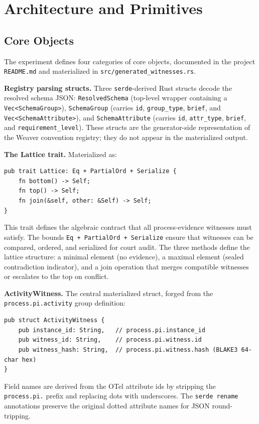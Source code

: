
\section{Architecture and Primitives}
\label{sec:otel-weaver-exp-004-registry-to-witness-architecture}

\subsection{Core Objects}
\label{sec:otel-weaver-exp-004-registry-to-witness-objects}

The experiment defines four categories of core objects, documented in the project
\texttt{README.md} and materialized in \texttt{src/generated\_witnesses.rs}.

\textbf{Registry parsing structs.} Three \texttt{serde}-derived Rust structs decode the
resolved schema JSON: \texttt{ResolvedSchema} (top-level wrapper containing a
\texttt{Vec<SchemaGroup>}), \texttt{SchemaGroup} (carries \texttt{id}, \texttt{group\_type},
\texttt{brief}, and \texttt{Vec<SchemaAttribute>}), and \texttt{SchemaAttribute} (carries
\texttt{id}, \texttt{attr\_type}, \texttt{brief}, and \texttt{requirement\_level}). These
structs are the generator-side representation of the Weaver convention registry; they do
not appear in the materialized output.

\textbf{The Lattice trait.} Materialized as:
\begin{verbatim}
pub trait Lattice: Eq + PartialOrd + Serialize {
    fn bottom() -> Self;
    fn top() -> Self;
    fn join(&self, other: &Self) -> Self;
}
\end{verbatim}
This trait defines the algebraic contract that all process-evidence witnesses must satisfy.
The bounds \texttt{Eq + PartialOrd + Serialize} ensure that witnesses can be compared,
ordered, and serialized for court audit. The three methods define the lattice structure:
a minimal element (no evidence), a maximal element (sealed contradiction indicator), and
a join operation that merges compatible witnesses or escalates to the top on conflict.

\textbf{ActivityWitness.} The central materialized struct, forged from the
\texttt{process.pi.activity} group definition:
\begin{verbatim}
pub struct ActivityWitness {
    pub instance_id: String,   // process.pi.instance_id
    pub witness_id: String,    // process.pi.witness.id
    pub witness_hash: String,  // process.pi.witness.hash (BLAKE3 64-char hex)
}
\end{verbatim}
Field names are derived from the OTel attribute ids by stripping the \texttt{process.pi.}
prefix and replacing dots with underscores. The \texttt{serde rename} annotations preserve
the original dotted attribute names for JSON round-tripping.

